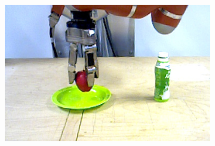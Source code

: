 \begin{figure}[]
\begin{subfigure}[t]{0.475\textwidth}
    \label{fig:sec_examplescenario_pickandplace_2j}
  \end{subfigure}
  \hfil
  \begin{subfigure}[t]{0.475\textwidth}
    \centering
    \label{fig:sec_examplescenario_pickandplace_2t}
  \end{subfigure}\\%
  \begin{subfigure}[t]{0.475\textwidth}
    \centering
    \includegraphics[width=\textwidth]{./figures/sec/scenario/darktable_exported/frame0893.jpg}
    \label{fig:sec_examplescenario_pickandplace_3j}
  \end{subfigure}
  \hfil
  \begin{subfigure}[t]{0.475\textwidth}
    \centering
    \label{fig:sec_examplescenario_pickandplace_3t}
  \end{subfigure}
\end{figure}
